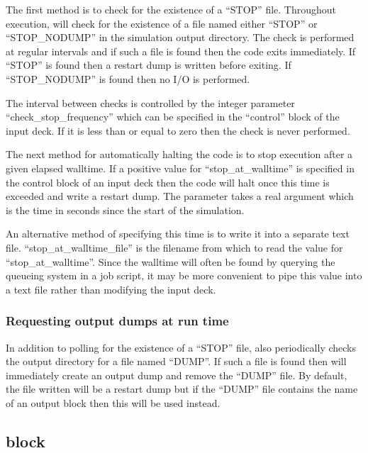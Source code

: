 The first method is to check for the existence of a ``STOP'' file. Throughout
execution, {\EPOCH} will check for the existence of a file named either
``STOP'' or ``STOP\_NODUMP'' in the simulation output directory. The check is
performed at regular intervals and if such a file is found then the code
exits immediately. If ``STOP'' is found then a restart dump is written before
exiting. If ``STOP\_NODUMP'' is found then no I/O is performed.

The interval between checks is controlled by the integer parameter
``check\_stop\_frequency'' which can be specified in the ``control''
block of the input deck. If it is less than or equal to zero then
the check is never performed.

The next method for automatically halting the code is to stop execution after
a given elapsed walltime.
If a positive value for ``stop\_at\_walltime'' is specified in the
control block of an input deck then the code will halt once this
time is exceeded and write a restart dump. The parameter takes a real
argument which is the time in seconds since the start of the simulation.

An alternative method of specifying this time is to write it into a separate
text file. ``stop\_at\_walltime\_file'' is the filename from which to read the
value for ``stop\_at\_walltime''. Since the walltime will often be
found by querying the queueing system in a job script, it may be
more convenient to pipe this value into a text file rather than
modifying the input deck.


\subsubsection{Requesting output dumps at run time}
\label{sec:dump_request}
In addition to polling for the existence of a ``STOP'' file, {\EPOCH} also
periodically checks the output directory for a file named ``DUMP''. If such
a file is found then {\EPOCH} will immediately create an output dump and
remove the ``DUMP'' file. By default, the file written will be a restart
dump but if the ``DUMP'' file contains the name of an output block then this
will be used instead.


\subsection{\texorpdfstring
  { block}
  {           {stencil} block}}
\label{sec:stencil_block}


